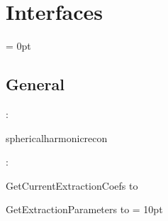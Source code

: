 
\section{Interfaces} 


\parskip = 0pt

\vspace{3mm} \subsection*{General}

: 

sphericalharmonicrecon
\vspace{2mm}

\vspace{5mm}

: 



GetCurrentExtractionCoefs to 

GetExtractionParameters to 
\vspace{2mm}\parskip = 10pt 
